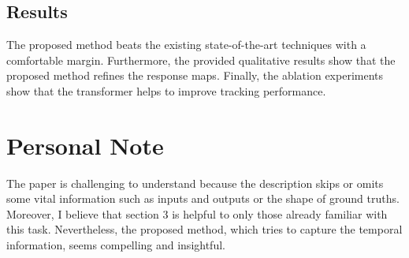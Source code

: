\documentclass[10pt,twocolumn,letterpaper]{article}
\begin{document}
\subsection{Results}
The proposed method beats the existing state-of-the-art techniques with a comfortable margin. Furthermore, the provided qualitative results show that the proposed method refines the response maps. Finally, the ablation experiments show that the transformer helps to improve tracking performance.

\section{Personal Note}
The paper is challenging to understand because the description skips or omits some vital information such as inputs and outputs or the shape of ground truths. Moreover, I believe that section 3 is helpful to only those already familiar with this task. Nevertheless, the proposed method, which tries to capture the temporal information, seems compelling and insightful.


{\small


}
\end{document}
